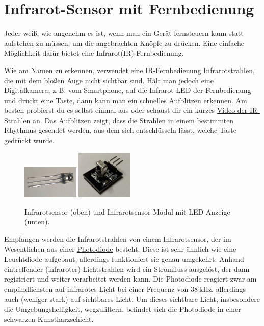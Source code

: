 \newpage
\section{Infrarot-Sensor mit Fernbedienung}
\label{sec:infrarot-fern}

Jeder weiß, wie angenehm es ist, wenn man ein Gerät fernsteuern kann statt aufstehen zu müssen, um die angebrachten Knöpfe zu drücken. Eine einfache Möglichkeit dafür bietet eine Infrarot(IR)-Fernbedienung.

Wie am Namen zu erkennen, verwendet eine IR-Fernbedienung Infrarotstrahlen, die mit dem bloßen Auge nicht sichtbar sind. Hält man jedoch eine Digitalkamera, z.\,B. vom Smartphone, auf die Infrarot-LED der Fernbedienung und drückt eine Taste, dann kann man ein schnelles Aufblitzen erkennen. Am besten probierst du es selbst einmal aus oder schaust dir ein kurzes \video \href{https://el-voss.de/downloads/ir-strahlen.html}{Video der IR-Strahlen} an. Das Aufblitzen zeigt, dass die Strahlen in einem bestimmten Rhythmus gesendet werden, aus dem sich entschlüsseln lässt, welche Taste gedrückt wurde.

\begin{figure}
	\centering
	\includegraphics[width=0.24\textwidth]{./pics/ir-sensor.jpg}
	\vspace{5mm}
	\includegraphics[width=0.24\textwidth]{./pics/ir-sensor-led-modul.png}
	\caption{Infrarotsensor (oben) und Infrarotsensor-Modul mit LED-Anzeige (unten).}
\end{figure}
Empfangen werden die Infrarotstrahlen von einem Infrarotsensor, der im Wesentlichen aus einer \href{https://de.wikipedia.org/wiki/Photodiode}{Photodiode} besteht. Diese ist sehr ähnlich wie eine Leuchtdiode aufgebaut, allerdings funktioniert sie genau umgekehrt: Anhand eintreffender (infraroter) Lichtstrahlen wird ein Stromfluss ausgelöst, der dann registriert und weiter verarbeitet werden kann. Die Photodiode reagiert zwar am empfindlichsten auf infrarotes Licht bei einer Frequenz von $\SI{38}{\kilo\hertz}$, allerdings auch (weniger stark) auf sichtbares Licht. Um dieses sichtbare Licht, insbesondere die Umgebungshelligkeit, wegzufiltern, befindet sich die Photodiode in einer schwarzen Kunstharzschicht. 

